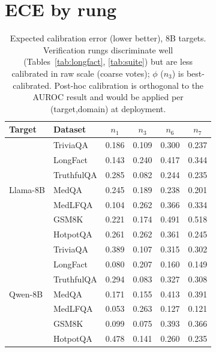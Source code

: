 \documentclass[11pt]{article}
\newcommand{\nverb}{$n_1$}     %
\newcommand{\nphi}{$n_3$}      %
\newcommand{\nyn}{$n_6$}       %
\newcommand{\nsc}{$n_7$}       %
\begin{document}
\section{ECE by rung}\label{app:ece}
\begin{table}[t]
\centering\small
\begin{tabular}{llcccc}
\toprule
Target & Dataset & \nverb & \nphi & \nyn & \nsc \\
\midrule
\multirow{7}{*}{Llama-8B}
 & TriviaQA   & 0.186 & 0.109 & 0.300 & 0.237 \\
 & LongFact   & 0.143 & 0.240 & 0.417 & 0.344 \\
 & TruthfulQA & 0.285 & 0.082 & 0.244 & 0.235 \\
 & MedQA      & 0.245 & 0.189 & 0.238 & 0.201 \\
 & MedLFQA    & 0.104 & 0.262 & 0.366 & 0.334 \\
 & GSM8K      & 0.221 & 0.174 & 0.491 & 0.518 \\
 & HotpotQA   & 0.261 & 0.262 & 0.361 & 0.245 \\
\midrule
\multirow{7}{*}{Qwen-8B}
 & TriviaQA   & 0.389 & 0.107 & 0.315 & 0.302 \\
 & LongFact   & 0.080 & 0.207 & 0.160 & 0.149 \\
 & TruthfulQA & 0.294 & 0.083 & 0.327 & 0.308 \\
 & MedQA      & 0.171 & 0.155 & 0.413 & 0.391 \\
 & MedLFQA    & 0.053 & 0.263 & 0.127 & 0.121 \\
 & GSM8K      & 0.099 & 0.075 & 0.393 & 0.366 \\
 & HotpotQA   & 0.478 & 0.141 & 0.260 & 0.235 \\
\bottomrule
\end{tabular}
\caption{Expected calibration error (lower better), 8B targets. Verification rungs
discriminate well (Tables~\ref{tab:longfact}, \ref{tab:suite}) but are less calibrated in raw
scale (coarse votes); $\phi$ ($n_3$) is best-calibrated. Post-hoc calibration is orthogonal to
the AUROC result and would be applied per (target,domain) at deployment.}
\label{tab:ece}
\end{table}
\end{document}
